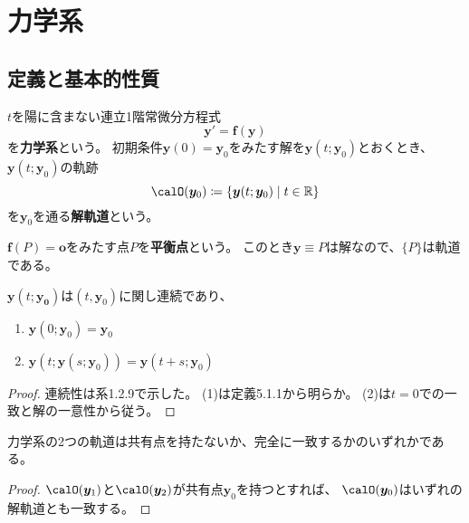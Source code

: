 \documentclass[report]{jlreq}
\begin{document}
\chapter{力学系}

\section{定義と基本的性質}

\begin{definition}[5.1.1 力学系]
    $t$を陽に含まない連立1階常微分方程式
    \begin{equation}
        \bm{y}' = \bm{f}(\bm{y})
    \end{equation}
    を\textbf{力学系}という。
    初期条件$\bm{y}(0) = \bm{y}_0$をみたす解を$\bm{y}(t; \bm{y}_0)$とおくとき、
    $\bm{y}(t; \bm{y}_0)$の軌跡
    \begin{equation}
        \calO(\bm{y}_0) \coloneqq \{ \bm{y}(t; \bm{y}_0) \mid t \in \R \}
    \end{equation}
    を$\bm{y}_0$を通る\textbf{解軌道}という。
\end{definition}

\begin{definition}
    $\bm{f}(P) = \bm{o}$をみたす点$P$を\textbf{平衡点}という。
    このとき$\bm{y} \equiv P$は解なので、$\{P\}$は軌道である。
\end{definition}

\begin{proposition}[5.1.2]
    $\bm{y}(t; \bm{y_0})$は$(t, \bm{y}_0)$に関し連続であり、
    \begin{enumerate}
        \item $\bm{y}(0; \bm{y}_0) = \bm{y}_0$
        \item $\bm{y}(t; \bm{y}(s; \bm{y}_0)) = \bm{y}(t + s; \bm{y}_0)$
    \end{enumerate}
\end{proposition}

\begin{proof}
    連続性は系1.2.9で示した。
    (1)は定義5.1.1から明らか。
    (2)は$t = 0$での一致と解の一意性から従う。
\end{proof}

\begin{proposition}[5.1.3]
    力学系の2つの軌道は共有点を持たないか、完全に一致するかのいずれかである。
\end{proposition}

\begin{proof}
    $\calO(\bm{y}_1)$と$\calO(\bm{y}_2)$が共有点$\bm{y}_0$を持つとすれば、
    $\calO(\bm{y}_0)$はいずれの解軌道とも一致する。
\end{proof}
\end{document}
